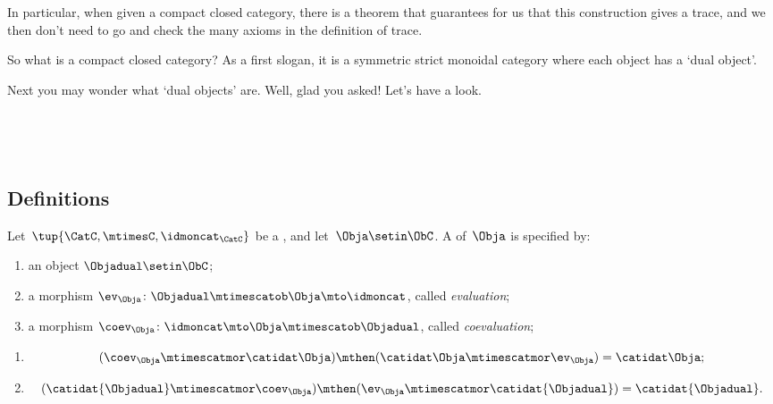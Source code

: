 In particular, when given a compact closed category, there is a theorem that guarantees for us that this construction gives a trace, and we then don't need to go and check the many axioms in the definition of trace. 

So what is a compact closed category? As a first slogan, it is a symmetric strict monoidal category where each object has a `dual object'. 

Next you may wonder what `dual objects' are. Well, glad you asked! Let's have a look. 


\



\

\subsection{Definitions}

\begin{ctdefinition}
    \label{def:dualizable-object}
    Let~$\tup{\CatC,\mtimesC,\idmoncat_{\CatC}}$ be a , and let~$\Obja \setin \ObC$.
    A  of~$\Obja$ is specified by:

    \constit
    \begin{enumerate}
        \item an object $\Objadual \setin \ObC$;
        \item a morphism $\ev_\Obja\colon \Objadual \mtimescatob \Obja \mto \idmoncat$, called \emph{evaluation}; \label{def:ev1}
        \item a morphism $\coev_\Obja\colon \idmoncat \mto \Obja \mtimescatob \Objadual$, called \emph{coevaluation};\label{def:coev1}
    \end{enumerate}

    \condit
    \begin{enumerate}
        \item
              \begin{equation}\label{eq:snake-eq-1}
                  (\coev_\Obja \mtimescatmor \catidat\Obja) \mthen (\catidat\Obja \mtimescatmor \ev_\Obja) = \catidat\Obja;
              \end{equation}
        \item
              \begin{equation}\label{eq:snack-eq-2}
                  (\catidat{\Objadual} \mtimescatmor \coev_\Obja) \mthen (\ev_\Obja \mtimescatmor \catidat{\Objadual}) = \catidat{\Objadual}.
              \end{equation}
    \end{enumerate}
\end{ctdefinition}

